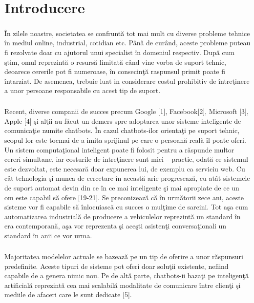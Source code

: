 \chapter{Introducere}

\paragraph{}
\^ In zilele noastre, societatea se confrunt\u a tot mai mult cu diverse probleme tehnice \^ in mediul online, industrial, cotidian etc. P\^ an\u a de cur\^ and, aceste probleme puteau fi rezolvate doar cu ajutorul unui specialist \^ in domeniul respectiv. Dup\u a cum \c stim, omul reprezint\u a o resurs\u a limitat\u a c\^ and vine vorba de suport tehnic, deoarece cererile pot fi numeroase, \^ in consecin\c t\u a raspunsul primit poate fi \^ intarziat. De asemenea, trebuie luat in considerare costul prohibitiv de \^ intre\c tinere a unor persoane responsabile cu acest tip de suport.

\paragraph{}
Recent, diverse companii de succes precum Google [1], Facebook[2], Microsoft [3], Apple [4] \c si al\c tii au f\u acut un demers spre adoptarea unor sisteme inteligente de comunica\c tie numite chatbots. \^ In cazul chatbots-ilor orienta\c ti pe suport tehnic, scopul lor este tocmai de a imita sprijinul pe care o persoan\u a real\u a \^ il poate oferi. Un sistem computa\c tional inteligent poate fi folosit pentru a r\u aspunde multor cereri simultane, iar costurile de intre\c tinere sunt mici – practic, odat\u a ce sistemul este dezvoltat, este necesar\u a doar expunerea lui, de exemplu ca serviciu web. Cu c\^ at tehnologia \c si munca de cercetare \^ in aceast\u a arie progreseaz\u a, cu at\^ at sistemele de suport automat devin din ce \^ in ce mai inteligente \c si mai apropiate de ce un om este capabil s\u a ofere [19-21]. Se preconizeaz\u a c\u a \^ in urm\u atorii zece ani, aceste sisteme vor fi capabile s\u a \^ inlocuiasc\u a cu succes o mul\c time de sarcini. Tot a\c sa cum automatizarea industrial\u a de producere a vehiculelor reprezint\u a un standard \^ in era contemporan\u a, a\c sa vor reprezenta \c si ace\c sti asisten\c ti conversa\c tionali un standard \^ in anii ce vor urma.

\paragraph{}
Majoritatea modelelor actuale se bazeaz\u a pe un tip de oferire a unor r\u aspunsuri predefinite. Aceste tipuri de sisteme pot oferi doar solu\c tii existente, nefiind capabile de a genera nimic nou. Pe de alt\u a parte, chatbots-ii baza\c ti pe inteligen\c t\u a artificial\u a reprezint\u a cea mai scalabil\u a modalitate de comunicare \^ intre clien\c ti \c si mediile de afaceri care le sunt dedicate [5].

